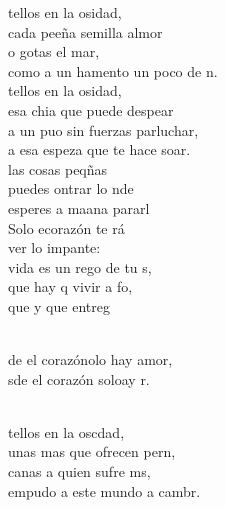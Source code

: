\begin{cancion}%
	tellos en la osidad,\\
	cada peeña semilla almor\\
	o gotas  el mar,\\
	como a un hamento un poco de n.\\
	tellos en la osidad,\\
	esa chia que puede despear\\
	a un puo sin fuerzas parluchar,\\
	a esa espeza que te hace soar.\\
	 las cosas peqñas \\
	puedes ontrar lo nde\\
	esperes a maana pararl\\
	Solo ecorazón te rá \\
	ver lo impante: \\
	 vida es un rego de tu s,\\
	que hay q vivir a fo, \\
	que y que entreg   \\\jump\\
	\begin{chorus}%
	de el corazónolo hay amor,\\
	sde el corazón soloay r.\\
	\end{chorus}%
	\jump\\
	tellos en la oscdad,\\
	unas mas que ofrecen pern, \\
	canas a quien sufre ms,\\
	empudo a este mundo a cambr.\\

\end{cancion}
